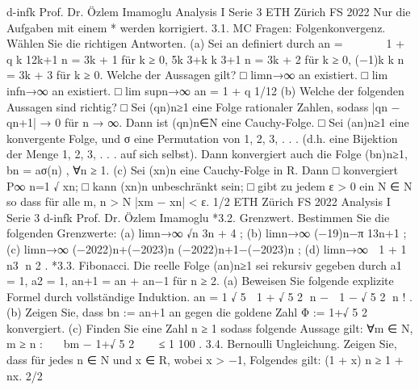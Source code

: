 d-infk
Prof. Dr. Özlem Imamoglu
Analysis I
Serie 3
ETH Zürich
FS 2022
Nur die Aufgaben mit einem * werden korrigiert.
3.1. MC Fragen: Folgenkonvergenz. Wählen Sie die richtigen Antworten.
(a) Sei an definiert durch
an =



1 + q k
12k+1 n = 3k + 1 für k ≥ 0,
5k
3+k
k
3+1 n = 3k + 2 für k ≥ 0,
(−1)k
k
n = 3k + 3 für k ≥ 0.
Welche der Aussagen gilt?
□ limn→∞ an existiert.
□ lim infn→∞ an existiert.
□ lim supn→∞ an = 1 + q
1/12
(b) Welche der folgenden Aussagen sind richtig?
□ Sei (qn)n≥1 eine Folge rationaler Zahlen, sodass
|qn − qn+1| → 0 für n → ∞.
Dann ist (qn)n∈N eine Cauchy-Folge.
□ Sei (an)n≥1 eine konvergente Folge, und σ eine Permutation von {1, 2, 3, . . . }
(d.h. eine Bijektion der Menge {1, 2, 3, . . . } auf sich selbst). Dann konvergiert auch die Folge (bn)n≥1, bn = aσ(n)
, ∀n ≥ 1.
(c) Sei (xn)n eine Cauchy-Folge in R. Dann
□ konvergiert P∞
n=1 √
xn;
□ kann (xn)n unbeschränkt sein;
□ gibt zu jedem ε > 0 ein N ∈ N so dass für alle m, n > N
|xm − xn| < ε.
1/2
ETH Zürich
FS 2022
Analysis I
Serie 3
d-infk
Prof. Dr. Özlem Imamoglu
*3.2. Grenzwert. Bestimmen Sie die folgenden Grenzwerte:
(a) limn→∞
√n
3n + 4 ;
(b) limn→∞
(−19)n−π
13n+1 ;
(c) limn→∞
(−2022)n+(−2023)n
(−2022)n+1−(−2023)n ;
(d) limn→∞

1 + 1
n3
n
2
.
*3.3. Fibonacci. Die reelle Folge (an)n≥1 sei rekursiv gegeben durch
a1 = 1, a2 = 1, an+1 = an + an−1 für n ≥ 2.
(a) Beweisen Sie folgende explizite Formel durch vollständige Induktion.
an =
1
√
5
 
1 + √
5
2
n
−

1 −
√
5
2
n
!
.
(b) Zeigen Sie, dass bn :=
an+1
an
gegen die goldene Zahl Φ :=
1+√
5
2
konvergiert.
(c) Finden Sie eine Zahl n ≥ 1 sodass folgende Aussage gilt:
∀m ∈ N, m ≥ n :


bm −
1+√
5
2


 ≤
1
100 .
3.4. Bernoulli Ungleichung. Zeigen Sie, dass für jedes n ∈ N und x ∈ R, wobei
x > −1, Folgendes gilt:
(1 + x)
n ≥ 1 + nx.
2/2

